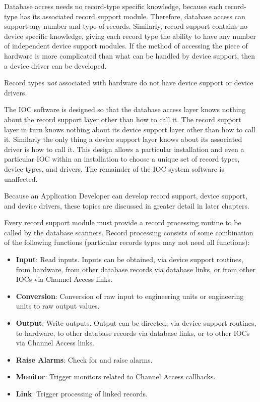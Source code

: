 Database access needs no record-type specific knowledge, because each record-type has its associated record support 
module. Therefore, database access can support any number and type of records. Similarly, record support contains no 
device specific knowledge, giving each record type the ability to have any number of independent device support 
modules. If the method of accessing the piece of hardware is more complicated than what can be handled by device 
support, then a device driver can be developed. 

Record types \emph{not} associated with hardware do not have device support or device drivers.

The IOC software is designed so that the database access layer knows nothing about the record support layer other than 
how to call it. The record support layer in turn knows nothing about its device support layer other than how to call it. 
Similarly the only thing a device support layer knows about its associated driver is how to call it. This design allows a 
particular installation and even a particular IOC within an installation to choose a unique set of record types, device types, 
and drivers. The remainder of the IOC system software is unaffected.

Because an Application Developer can develop record support, device support, and device drivers, these topics are 
discussed in greater detail in later chapters.

Every record support module must provide a record processing routine to be called by the database scanners. Record 
processing consists of some combination of the following functions (particular records types may not need all functions):

\begin{itemize}
\item \textbf{Input}:  Read inputs. Inputs can be obtained, via device support routines, from hardware, from other database 
records via database links, or from other IOCs via Channel Access links.

\item \textbf{Conversion}:  Conversion of raw input to engineering units or engineering units to raw output values.

\item \textbf{Output}:  Write outputs. Output can be directed, via device support routines, to hardware, to other database records 
via database links, or to other IOCs via Channel Access links.

\item \textbf{Raise Alarms}:  Check for and raise alarms.

\item \textbf{Monitor}:  Trigger monitors related to Channel Access callbacks.

\item \textbf{Link}:  Trigger processing of linked records.
\end{itemize}

